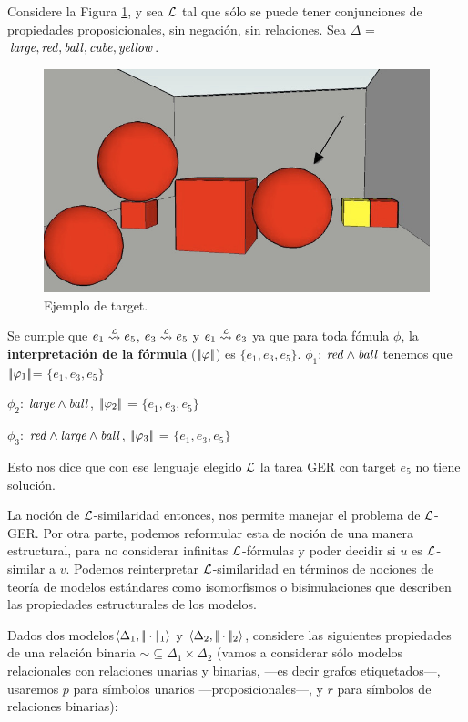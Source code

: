 Considere la Figura \ref{target_mapa_3ball}, y sea $\mathcal{L}$ tal que s\'olo se puede tener conjunciones de propiedades proposicionales, 
sin negaci\'on, sin relaciones. Sea $\Delta$ = ${\mathit{large}, \mathit{red}, \mathit{ball}, \mathit{cube}, \mathit{yellow}}$.
\begin{figure}[H]
\centering
\includegraphics[width=.6\textwidth]{images/22paraRelacional.jpg}
\caption{Ejemplo de target.}
\label{target_mapa_3ball}
\end{figure}

Se cumple que  $e_1 \simil{\+L} e_5$, $e_3 \simil{\+L} e_5$ y $e_1 \simil{\+L} e_3$ ya que para toda f\'omula $\phi$, la {\bf interpretaci\'on de la f\'ormula} ($|\!|\varphi|\!|$) es $\{e_1, e_3, e_5\}$. 
$\phi_1$: $\mathit{red} \land \mathit{ball}$ tenemos que $|\!|\varphi_1|\!| $= $\{e_1, e_3, e_5\}$

$\phi_2$: $\mathit{large} \land \mathit{ball}$, $|\!|\varphi_2|\!| $ = $\{e_1, e_3, e_5\}$

$\phi_3$: $\mathit{red} \land \mathit{large} \land \mathit{ball}$, $|\!|\varphi_3|\!|$ = $\{e_1, e_3, e_5\}$

Esto nos dice que con ese lenguaje elegido $\mathcal{L}$ la tarea GER con target $e_5$ no tiene soluci\'on.

La noci\'on de $\mathcal{L}$-similaridad entonces, nos permite manejar el problema de  $\mathcal{L}$-GER.
Por otra parte, podemos reformular esta de noci\'on de una manera estructural, para no considerar infinitas $\mathcal{L}$-f\'ormulas y poder decidir si $u$ es $\mathcal{L}$-similar a $v$. Podemos reinterpretar $\mathcal{L}$-similaridad en t\'erminos de nociones de teor\'ia de modelos est\'andares
como isomorfismos o bisimulaciones que describen las propiedades estructurales de los modelos. 

Dados dos modelos$\langle \Delta_1, |\!|\cdot|\!|_1 \rangle$ y $\langle \Delta_2,
|\!|\cdot|\!|_2 \rangle$, considere las siguientes
propiedades de una relaci\'on binaria ${\sim} \subseteq \Delta_1 \times \Delta_2$ 
(vamos a considerar s\'olo modelos relacionales con relaciones unarias y binarias, ---es decir grafos etiquetados---, usaremos $p$ para 
s\'imbolos unarios ---proposicionales---, y $r$ para s\'imbolos de relaciones binarias):
\smallskip 


